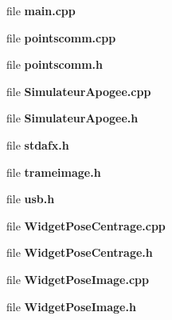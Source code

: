 \begin{CompactItemize}
\item 
file {\bf main.cpp}
\item 
file {\bf pointscomm.cpp}
\item 
file {\bf pointscomm.h}
\item 
file {\bf Simulateur\-Apogee.cpp}
\item 
file {\bf Simulateur\-Apogee.h}
\item 
file {\bf stdafx.h}
\item 
file {\bf trameimage.h}
\item 
file {\bf usb.h}
\item 
file {\bf Widget\-Pose\-Centrage.cpp}
\item 
file {\bf Widget\-Pose\-Centrage.h}
\item 
file {\bf Widget\-Pose\-Image.cpp}
\item 
file {\bf Widget\-Pose\-Image.h}
\end{CompactItemize}
